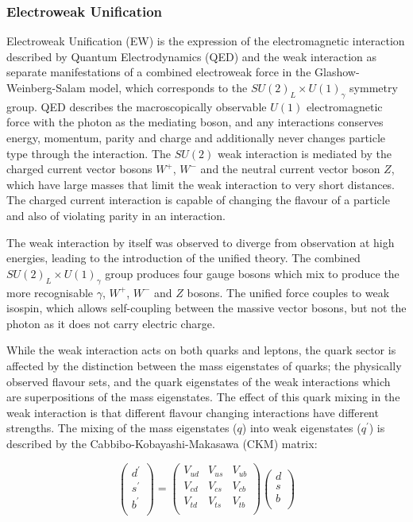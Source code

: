 		\subsubsection{Electroweak Unification} 
		
		Electroweak Unification (EW) is the expression of the electromagnetic interaction described by Quantum Electrodynamics (QED) and the weak interaction as separate manifestations of a combined electroweak force in the Glashow-Weinberg-Salam model, which corresponds to the $SU(2)_L\times U(1)_\gamma$ symmetry group. QED describes the macroscopically observable $U(1)$ electromagnetic force  with the photon as the mediating boson, and any interactions conserves energy, momentum, parity and charge and additionally never changes particle type through the interaction. The $SU(2)$ weak interaction is mediated by the charged current vector bosons $W^+$, $W^-$ and the neutral current vector boson $Z$, which have large masses that limit the weak interaction to very short distances. The charged current interaction is capable of changing the flavour of a particle and also of violating parity in an interaction. 
		
		The weak interaction by itself was observed to diverge from observation at high energies, leading to the introduction of the unified theory. The combined  $SU(2)_L\times U(1)_\gamma$ group produces four gauge bosons which mix to produce the more recognisable $\gamma$, $W^+$, $W^-$  and $Z$ bosons. The unified force couples to weak isospin, which allows self-coupling between the massive vector bosons, but not the photon as it does not carry electric charge.
		
		While the weak interaction acts on both quarks and leptons, the quark sector is affected by the distinction between the mass eigenstates of quarks; the physically observed flavour sets, and the quark eigenstates of the weak interactions which are superpositions of the mass eigenstates. The effect of this quark mixing in the weak interaction is that different flavour changing interactions have different strengths. The mixing of the mass eigenstates ($q$) into weak eigenstates ($q^\prime$) is described by the Cabbibo-Kobayashi-Makasawa (CKM) matrix:
		
		\begin{equation}
		\begin{pmatrix}
		d^\prime \\
		s^\prime\\
		b^\prime \\
		\end{pmatrix}
		 = \begin{pmatrix}
		V_{ud} & V_{us} & V_{ub} \\
		V_{cd} & V_{cs} & V_{cb} \\
		V_{td} & V_{ts} & V_{tb} \\
		\end{pmatrix}
	    \begin{pmatrix}
	    d \\
	    s\\
	    b \\
	    \end{pmatrix}
		\end{equation}
		
